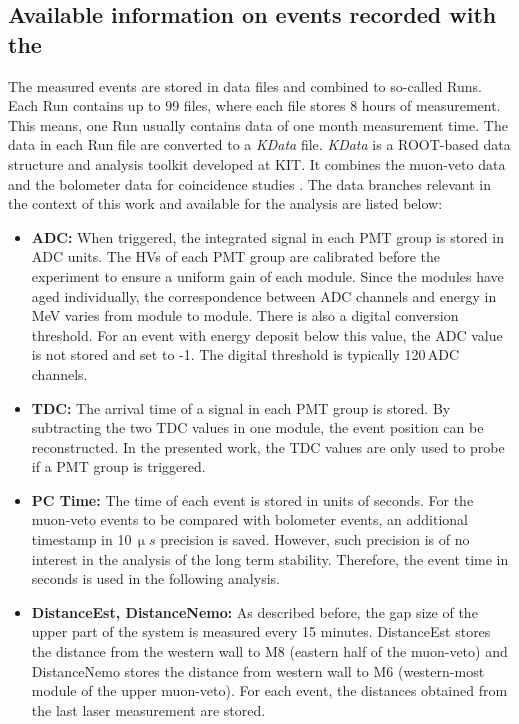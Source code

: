 \subsection{Available information on events recorded with the \mvs{}}

The measured events are stored in data files and combined to so-called Runs. Each Run contains up to 99 files, where each file stores 8 hours of measurement. This means, one Run usually contains data of one month measurement time. The data in each Run file are converted to a \textit{KData} file. \textit{KData} is a ROOT-based \cite{Bru97} data structure and analysis toolkit developed at KIT. It combines the muon-veto data and the bolometer data for coincidence studies \cite{Cox12}.
The data branches relevant in the context of this work and available for the analysis are listed below:
\begin{itemize}
  \item \textbf{ADC: }
  When triggered, the integrated signal in each PMT group is stored in ADC units. The HVs of each PMT group are calibrated before the experiment to ensure a uniform gain of each module. Since the modules have aged individually, the correspondence between ADC channels and energy in MeV varies from module to module. There is also a digital conversion threshold. For an event with energy deposit below this value, the ADC value is not stored and set to -1. The digital threshold is typically 120\,ADC channels.

  \item \textbf{TDC: }
  The arrival time of a signal in each PMT group is stored. By subtracting the two TDC values in one module, the event position can be reconstructed. In the presented work, the TDC values are only used to probe if a PMT group is triggered.

  \item \textbf{PC Time: }
  The time of each event is stored in units of seconds. For the muon-veto events to be compared with bolometer events, an additional timestamp in 10$\,\si{\upmu s}$ precision is saved. However, such precision is of no interest in the analysis of the long term stability. Therefore, the event time in seconds is used in the following analysis.

  \item \textbf{DistanceEst, DistanceNemo:}
  As described before, the gap size of the upper part of the system is measured every 15 minutes. DistanceEst stores the distance from the western wall to M8 (eastern half of the muon-veto) and DistanceNemo stores the distance from western wall to M6 (western-most module of the upper muon-veto). For each event, the distances obtained from the last laser measurement are stored.


\end{itemize}
